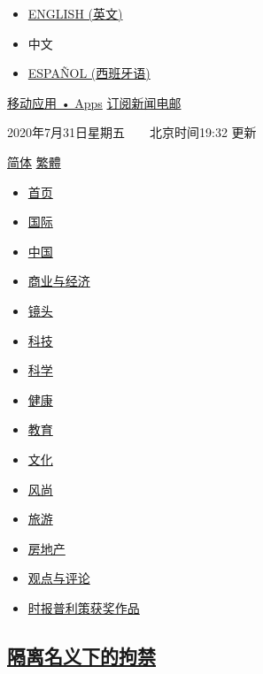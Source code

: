 \begin{itemize}
\tightlist
\item
  \href{http://www.nytimes3xbfgragh.onion/}{ENGLISH (英文)}
\item
  中文
\item
  \href{http://www.nytimes3xbfgragh.onion/es/}{ESPAÑOL (西班牙语)}
\end{itemize}

\href{/apps}{移动应用 • Apps} \textbar{}
\href{https://sso.nytcn.me/email/?source=top-right}{订阅新闻电邮}

2020年7月31日星期五~~~~北京时间19:32 更新

\href{https://cn.nytimes3xbfgragh.onion/tools/r.html?url=/\&langkey=zh-hans}{简体}
\textbar{}
\href{https://cn.nytimes3xbfgragh.onion/tools/r.html?url=/zh-hant/\&langkey=zh-hant}{繁體}

\begin{itemize}
\tightlist
\item
  \href{/}{首页}
\item
  \href{/world/}{国际}
\item
  \href{/china/}{中国}
\item
  \href{/business/}{商业与经济}
\item
  \href{/lens/}{镜头}
\item
  \href{/technology/}{科技}
\item
  \href{/science/}{科学}
\item
  \href{/health/}{健康}
\item
  \href{/education/}{教育}
\item
  \href{/culture/}{文化}
\item
  \href{/style/}{风尚}
\item
  \href{/travel/}{旅游}
\item
  \href{/real-estate/}{房地产}
\item
  \href{/opinion/}{观点与评论}
\item
  \href{//cn.nytimes3xbfgragh.onion/topic/20160427/pulitzers-topic/?utm_source=news\&utm_medium=nav\&utm_campaign=nav-topic-nyt-pulitzer-prize}{时报普利策获奖作品}
\end{itemize}

\hypertarget{ux9694ux79bbux540dux4e49ux4e0bux7684ux62d8ux7981}{%
\subsection{\texorpdfstring{\href{/china/20200731/coronavirus-china-qurantine/}{隔离名义下的拘禁}}{隔离名义下的拘禁}}\label{ux9694ux79bbux540dux4e49ux4e0bux7684ux62d8ux7981}}

